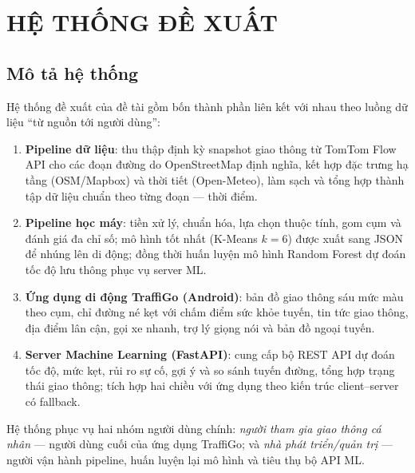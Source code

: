 \chapter{HỆ THỐNG ĐỀ XUẤT}

\section{Mô tả hệ thống}
Hệ thống đề xuất của đề tài gồm bốn thành phần liên kết với nhau theo luồng dữ liệu ``từ nguồn tới người dùng'':
\begin{enumerate}[label=\textbf{(\arabic*)},leftmargin=2cm,itemsep=2pt]
 \item \textbf{Pipeline dữ liệu}: thu thập định kỳ snapshot giao thông từ TomTom Flow API cho các đoạn đường do OpenStreetMap định nghĩa, kết hợp đặc trưng hạ tầng (OSM/Mapbox) và thời tiết (Open-Meteo), làm sạch và tổng hợp thành tập dữ liệu chuẩn theo từng đoạn --- thời điểm.
 \item \textbf{Pipeline học máy}: tiền xử lý, chuẩn hóa, lựa chọn thuộc tính, gom cụm và đánh giá đa chỉ số; mô hình tốt nhất (K-Means $k=6$) được xuất sang JSON để nhúng lên di động; đồng thời huấn luyện mô hình Random Forest dự đoán tốc độ lưu thông phục vụ server ML.
 \item \textbf{Ứng dụng di động TraffiGo (Android)}: bản đồ giao thông sáu mức màu theo cụm, chỉ đường né kẹt với chấm điểm sức khỏe tuyến, tin tức giao thông, địa điểm lân cận, gọi xe nhanh, trợ lý giọng nói và bản đồ ngoại tuyến.
 \item \textbf{Server Machine Learning (FastAPI)}: cung cấp bộ REST API dự đoán tốc độ, mức kẹt, rủi ro sự cố, gợi ý và so sánh tuyến đường, tổng hợp trạng thái giao thông; tích hợp hai chiều với ứng dụng theo kiến trúc client--server có fallback.
\end{enumerate}
Hệ thống phục vụ hai nhóm người dùng chính: \textit{người tham gia giao thông cá nhân} --- người dùng cuối của ứng dụng TraffiGo; và \textit{nhà phát triển/quản trị} --- người vận hành pipeline, huấn luyện lại mô hình và tiêu thụ bộ API ML.

